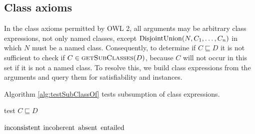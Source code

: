 \documentclass[paper.tex]{subfiles}
\begin{document}
\subsection{Class axioms}
\label{sec:algorithms:class}

In the class axioms permitted by OWL 2, all arguments may be arbitrary class expressions, not only named classes, except $\mathrm{DisjointUnion}(N, C_1, \ldots, C_n)$ in which $N$ must be a named class.  Consequently, to determine if $C \sqsubseteq D$ it is not sufficient to check if $C \in \Call{getSubClasses}{D}$, because $C$ will not occur in this set if it is not a named class.  To resolve this, we build class expressions from the arguments and query them for satisfiability and instances.

Algorithm \ref{alg:testSubClassOf} tests subsumption of class expressions.

\begin{algorithm}[H]
  \caption{test $C \sqsubseteq D$}
  \label{alg:testSubClassOf}
  \begin{algorithmic}[1]
    \raggedright
        \label{alg:testSubClassOf:checkInconsistent}
        \State \Return $\mathrm{inconsistent}$
        \label{alg:testSubClassOf:returnInconsistent}
        \label{alg:testSubClassOf:checkIncoherent}
        \State \Return $\mathrm{incoherent}$
        \label{alg:testSubClassOf:returnIncoherent}
        \label{alg:testSubClassOf:checkAbsent}
        \State \Return $\mathrm{absent}$
      \Else
        \State \Return $\mathrm{entailed}$
        \label{alg:testSubClassOf:returnEntailed}
      \EndIf
    \EndFunction
  \end{algorithmic}
\end{algorithm}
\end{document}
